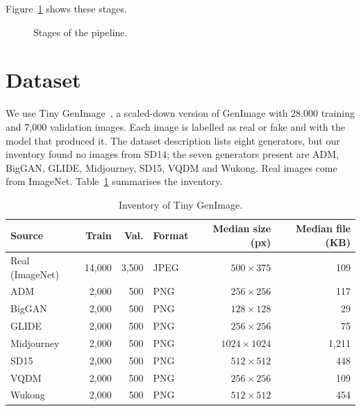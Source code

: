 \documentclass{mnnit}
\begin{document}
Figure~\ref{fig:flow-pipeline} shows these stages.

\begin{figure}[htbp]
\centering
{}
\caption{Stages of the pipeline.}
\label{fig:flow-pipeline}
\end{figure}

\section{Dataset}
We use Tiny GenImage~\cite{tinygenimage}, a scaled-down version of
GenImage with 28{,}000 training and 7{,}000 validation images. Each
image is labelled as real or fake and with the model that produced it.
The dataset description lists eight generators, but our inventory found
no images from SD14; the seven generators present are ADM, BigGAN,
GLIDE, Midjourney, SD15, VQDM and Wukong. Real images come from
ImageNet. Table~\ref{tab:inventory} summarises the inventory.

\begin{table}[htbp]
\centering
\caption{Inventory of Tiny GenImage.}
\label{tab:inventory}
\small
\setlength{\tabcolsep}{4pt}
\begin{tabular}{lrrlrr}
\toprule
\textbf{Source} & \textbf{Train} & \textbf{Val.} & \textbf{Format} & \textbf{Median size (px)} & \textbf{Median file (KB)}\\
\midrule
Real (ImageNet) & 14{,}000 & 3{,}500 & JPEG & $500\times375$ & 109\\
ADM        & 2{,}000 & 500 & PNG & $256\times256$ & 117\\
BigGAN     & 2{,}000 & 500 & PNG & $128\times128$ & 29\\
GLIDE      & 2{,}000 & 500 & PNG & $256\times256$ & 75\\
Midjourney & 2{,}000 & 500 & PNG & $1024\times1024$ & 1{,}211\\
SD15       & 2{,}000 & 500 & PNG & $512\times512$ & 448\\
VQDM       & 2{,}000 & 500 & PNG & $256\times256$ & 109\\
Wukong     & 2{,}000 & 500 & PNG & $512\times512$ & 454\\
\bottomrule
\end{tabular}
\end{table}
\end{document}

